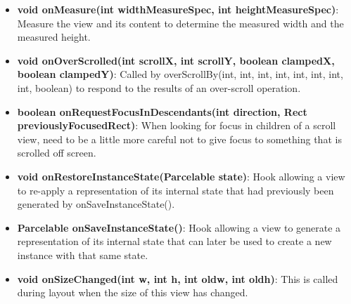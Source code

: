\documentclass{report}
\begin{document}
\begin{itemize}
\begin{itemize}
\begin{itemize}
                \item \textbf{void	onMeasure(int widthMeasureSpec, int heightMeasureSpec)}: Measure the view and its content to determine the measured width and the measured height.
                \item \textbf{void	onOverScrolled(int scrollX, int scrollY, boolean clampedX, boolean clampedY)}: Called by overScrollBy(int, int, int, int, int, int, int, int, boolean) to respond to the results of an over-scroll operation.
                \item \textbf{boolean	onRequestFocusInDescendants(int direction, Rect previouslyFocusedRect)}: When looking for focus in children of a scroll view, need to be a little more careful not to give focus to something that is scrolled off screen.
                \item \textbf{void	onRestoreInstanceState(Parcelable state)}: Hook allowing a view to re-apply a representation of its internal state that had previously been generated by onSaveInstanceState().
                \item \textbf{Parcelable	onSaveInstanceState()}: Hook allowing a view to generate a representation of its internal state that can later be used to create a new instance with that same state.
                \item \textbf{void	onSizeChanged(int w, int h, int oldw, int oldh)}: This is called during layout when the size of this view has changed.
            \end{itemize}
    \end{itemize}

    \pagebreak 

\end{itemize}
\end{document}
